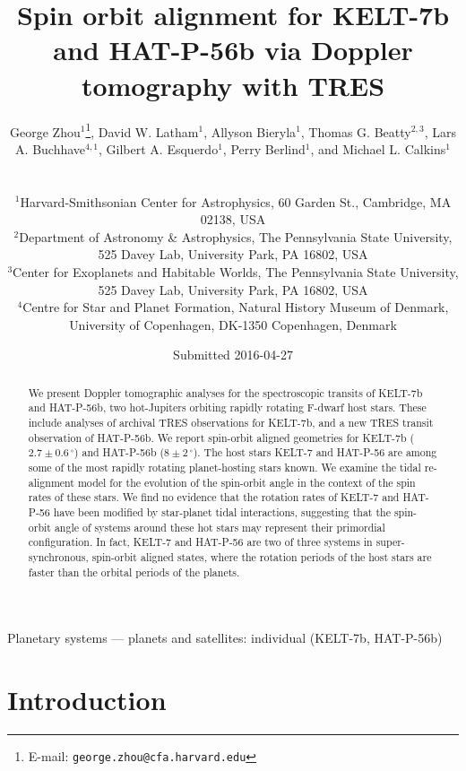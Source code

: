 \documentclass[useAMS,usenatbib]{mn2e}
\title[Doppler tomography with TRES]{Spin orbit alignment for KELT-7b and HAT-P-56b via Doppler tomography with TRES}
\author[G.~Zhou et al.]
{\parbox{\textwidth}
  {George Zhou$^{1}$\thanks{E-mail: \texttt{george.zhou@cfa.harvard.edu}},
    David W. Latham$^{1}$,
    Allyson Bieryla$^{1}$,
    Thomas G. Beatty$^{2,3}$,
    Lars A. Buchhave$^{4,1}$,
    Gilbert A. Esquerdo$^{1}$,
    Perry Berlind$^{1}$,
    and Michael L. Calkins$^{1}$
\vspace{0.4cm}}\\
\parbox{\textwidth}{
  $^{1}${Harvard-Smithsonian Center for Astrophysics, 60 Garden St., Cambridge, MA 02138, USA}\\
  $^{2}${Department of Astronomy \& Astrophysics, The Pennsylvania State University, 525 Davey Lab, University Park, PA 16802, USA}\\
  $^{3}${Center for Exoplanets and Habitable Worlds, The Pennsylvania State University, 525 Davey Lab, University Park, PA 16802, USA}\\
  $^{4}${Centre for Star and Planet Formation, Natural History Museum of Denmark, University of Copenhagen, DK-1350 Copenhagen, Denmark}\\
}}
\begin{document}

\date{Submitted 2016-04-27}

\pagerange{\pageref{firstpage}--\pageref{lastpage}} 

\maketitle

\label{firstpage}

\begin{abstract}
We present Doppler tomographic analyses for the spectroscopic transits of KELT-7b and HAT-P-56b, two hot-Jupiters orbiting rapidly rotating F-dwarf host stars. These include analyses of archival TRES observations for KELT-7b, and a new TRES transit observation of HAT-P-56b. We report spin-orbit aligned geometries for KELT-7b ($2.7 \pm 0.6\,^\circ$) and HAT-P-56b ($8 \pm 2\,^\circ$). The host stars KELT-7 and HAT-P-56 are among some of the most rapidly rotating planet-hosting stars known. We examine the tidal re-alignment model for the evolution of the spin-orbit angle in the context of the spin rates of these stars. We find no evidence that the rotation rates of KELT-7 and HAT-P-56 have been modified by star-planet tidal interactions, suggesting that the spin-orbit angle of systems around these hot stars may represent their primordial configuration. In fact, KELT-7 and HAT-P-56 are two of three systems in super-synchronous, spin-orbit aligned states, where the rotation periods of the host stars are faster than the orbital periods of the planets.
\end{abstract}

\begin{keywords}
Planetary systems — planets and satellites: individual (KELT-7b, HAT-P-56b)
\end{keywords}


\section{Introduction}
\label{sec:introduction}
\end{document}

